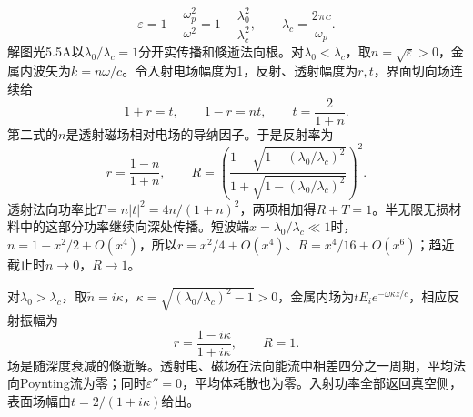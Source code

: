 \documentclass[UTF8,fontset=fandol,a4paper,11pt]{ctexart}
\begin{document}
\[
\varepsilon=1-\frac{\omega_p^2}{\omega^2}
=1-\frac{\lambda_0^2}{\lambda_c^2},\qquad
\lambda_c=\frac{2\pi c}{\omega_p}.
\]
解图光5.5A以$\lambda_0/\lambda_c=1$分开实传播和倏逝法向根。对$\lambda_0<\lambda_c$，取$n=\sqrt{\varepsilon}>0$，金属内波矢为$k=n\omega/c$。令入射电场幅度为1，反射、透射幅度为$r,t$，界面切向场连续给
\[
 1+r=t,\qquad 1-r=nt,\qquad t=\frac2{1+n}.
\]
第二式的$n$是透射磁场相对电场的导纳因子。于是反射率为
\[
r=\frac{1-n}{1+n},\qquad
\boxed{R=\left(\frac{1-\sqrt{1-(\lambda_0/\lambda_c)^2}}
{1+\sqrt{1-(\lambda_0/\lambda_c)^2}}\right)^2}.
\]
透射法向功率比$T=n|t|^2=4n/(1+n)^2$，两项相加得$R+T=1$。半无限无损材料中的这部分功率继续向深处传播。短波端$x=\lambda_0/\lambda_c\ll1$时，$n=1-x^2/2+O(x^4)$，所以$r=x^2/4+O(x^4)$、$R=x^4/16+O(x^6)$；趋近截止时$n\to0$，$R\to1$。

对$\lambda_0>\lambda_c$，取$\widetilde n=i\kappa$，$\kappa=\sqrt{(\lambda_0/\lambda_c)^2-1}>0$，金属内场为$tE_i e^{-\omega\kappa z/c}$，相应反射振幅为
\[
r=\frac{1-i\kappa}{1+i\kappa},\qquad \boxed{R=1}.
\]
场是随深度衰减的倏逝解。透射电、磁场在法向能流中相差四分之一周期，平均法向Poynting流为零；同时$\varepsilon''=0$，平均体耗散也为零。入射功率全部返回真空侧，表面场幅由$t=2/(1+i\kappa)$给出。
\end{document}
